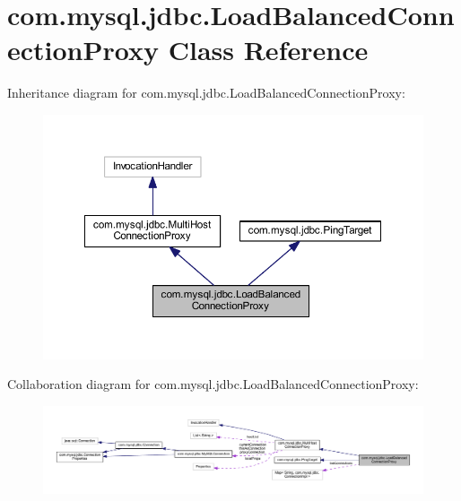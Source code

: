 \hypertarget{classcom_1_1mysql_1_1jdbc_1_1_load_balanced_connection_proxy}{}\section{com.\+mysql.\+jdbc.\+Load\+Balanced\+Connection\+Proxy Class Reference}
\label{classcom_1_1mysql_1_1jdbc_1_1_load_balanced_connection_proxy}


Inheritance diagram for com.\+mysql.\+jdbc.\+Load\+Balanced\+Connection\+Proxy\+:
\nopagebreak
\begin{figure}[H]
\begin{center}
\leavevmode
\includegraphics[width=350pt]{classcom_1_1mysql_1_1jdbc_1_1_load_balanced_connection_proxy__inherit__graph}
\end{center}
\end{figure}


Collaboration diagram for com.\+mysql.\+jdbc.\+Load\+Balanced\+Connection\+Proxy\+:
\nopagebreak
\begin{figure}[H]
\begin{center}
\leavevmode
\includegraphics[width=350pt]{classcom_1_1mysql_1_1jdbc_1_1_load_balanced_connection_proxy__coll__graph}
\end{center}
\end{figure}
